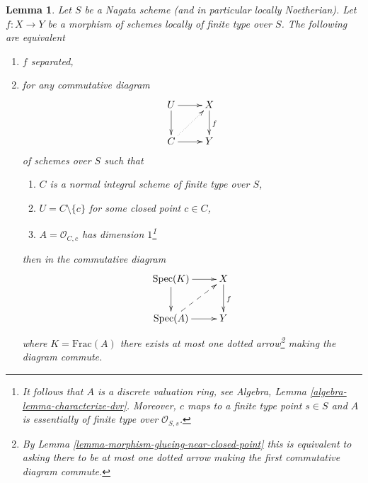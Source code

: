 \documentclass[10pt,a4paper]{amsart}
\theoremstyle{plain}
\newtheorem{lemma}[subsection]{Lemma}
\theoremstyle{definition}
\theoremstyle{remark}
\numberwithin{equation}{subsection}
\def\Spec{\mathop{\mathrm{Spec}}}
\begin{document}
\begin{lemma}
\label{lemma-essentially-finite-type-criterion-separation}
Let $S$ be a Nagata scheme (and in particular locally Noetherian).
Let $f : X \to Y$ be a morphism of schemes locally of finite type over $S$.
The following are equivalent
\begin{enumerate}
\item $f$ separated,
\item for any commutative diagram
$$
\xymatrix{
U \ar[r] \ar[d] & X \ar[d]^f \\
C \ar[r] \ar@{..>}[ru] & Y
}
$$
of schemes over $S$ such that
\begin{enumerate}
\item $C$ is a normal integral scheme of finite type over $S$,
\item $U = C \setminus \{c\}$ for some closed point $c \in C$,
\item $A = \mathcal{O}_{C, c}$ has dimension $1$\footnote{It follows
that $A$ is a discrete valuation ring, see
Algebra, Lemma \ref{algebra-lemma-characterize-dvr}.
Moreover, $c$ maps to a finite type point $s \in S$ and
$A$ is essentially of finite type over $\mathcal{O}_{S, s}$.}
\end{enumerate}
then in the commutative diagram
$$
\xymatrix{
\Spec(K) \ar[r] \ar[d] & X \ar[d]^f \\
\Spec(A) \ar[r] \ar@{-->}[ru] & Y
}
$$
where $K = \text{Frac}(A)$ there exists at most one dotted arrow\footnote{By
Lemma \ref{lemma-morphism-glueing-near-closed-point} this is
equivalent to asking there to be at most one dotted arrow
making the first commutative diagram commute.}
making the diagram commute.
\end{enumerate}
\end{lemma}
\end{document}
